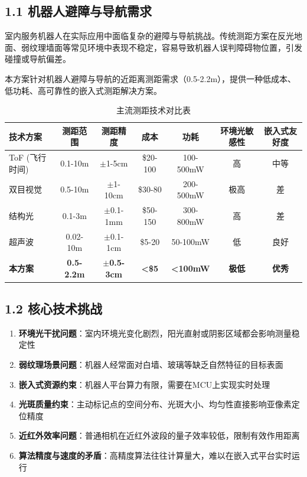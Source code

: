 \documentclass[12pt,a4paper]{article}
\begin{document}
\subsection{1.1 机器人避障与导航需求}

室内服务机器人在实际应用中面临复杂的避障与导航挑战。传统测距方案在反光地面、弱纹理墙面等常见环境中表现不稳定，容易导致机器人误判障碍物位置，引发碰撞或导航偏差。

本方案针对机器人避障与导航的近距离测距需求（0.5-2.2m），提供一种低成本、低功耗、高可靠性的嵌入式测距解决方案。

\begin{table}[H]
\centering
\caption{主流测距技术对比表}
\begin{tabular}{lcccccc}
\toprule
技术方案 & 测距范围 & 测距精度 & 成本 & 功耗 & 环境光敏感性 & 嵌入式友好度 \\
\midrule
ToF (飞行时间) & 0.1-10m & $\pm$1-5cm & \$20-100 & 100-500mW & 高 & 中等 \\
双目视觉 & 0.5-10m & $\pm$1-10cm & \$30-80 & 200-500mW & 极高 & 差 \\
结构光 & 0.1-3m & $\pm$0.1-1mm & \$50-150 & 300-800mW & 高 & 差 \\
超声波 & 0.02-10m & $\pm$0.1-1cm & \$5-20 & 50-100mW & 低 & 良好 \\
\textbf{本方案} & \textbf{0.5-2.2m} & \textbf{$\pm$0.5-3cm} & \textbf{<\$5} & \textbf{<100mW} & \textbf{极低} & \textbf{优秀} \\
\bottomrule
\end{tabular}
\end{table}

\subsection{1.2 核心技术挑战}

\begin{enumerate}
\item \textbf{环境光干扰问题}：室内环境光变化剧烈，阳光直射或阴影区域都会影响测量稳定性
\item \textbf{弱纹理场景问题}：机器人经常面对白墙、玻璃等缺乏自然特征的目标表面
\item \textbf{嵌入式资源约束}：机器人平台算力有限，需要在MCU上实现实时处理
\item \textbf{光斑质量约束}：主动标记点的空间分布、光斑大小、均匀性直接影响亚像素定位精度
\item \textbf{近红外效率问题}：普通相机在近红外波段的量子效率较低，限制有效作用距离
\item \textbf{算法精度与速度的矛盾}：高精度算法往往计算量大，难以在嵌入式平台实时运行
\end{enumerate}
\end{document}
